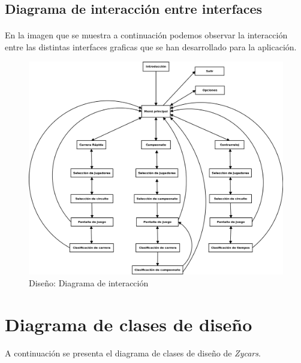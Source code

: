 \subsection{Diagrama de interacción entre interfaces}

\paragraph{}
En la imagen que se muestra a continuación podemos observar la interacción entre las distintas interfaces graficas que se han 
desarrollado para la aplicación.

\begin{figure}[H]
  \label{diagrama_interaccion}
  \begin{center}
    \includegraphics[scale=0.4]{imagenes/diagrama_interaccion.png}
  \end{center}
  \caption{Diseño: Diagrama de interacción}
\end{figure}

\section{Diagrama de clases de diseño}

A continuación se presenta el diagrama de clases de diseño de \emph{Zycars}.

\newpage

